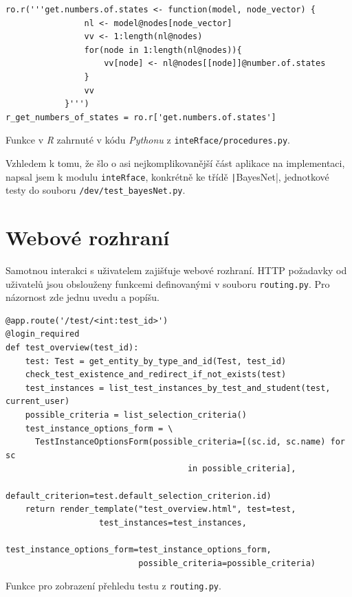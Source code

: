 \documentclass[a4paper,twoside,12pt]{scrbook}
\begin{document}
\begin{listing}
\centering
\begin{verbatim}
ro.r('''get.numbers.of.states <- function(model, node_vector) {
                nl <- model@nodes[node_vector]
                vv <- 1:length(nl@nodes)
                for(node in 1:length(nl@nodes)){
                    vv[node] <- nl@nodes[[node]]@number.of.states
                }
                vv
            }''')
r_get_numbers_of_states = ro.r['get.numbers.of.states']
\end{verbatim}
\caption{Funkce v \textit{R} zahrnuté v kódu \textit{Pythonu} z \texttt{inteRface/procedures.py}.}
\label{lst:PyR}
\end{listing}

Vzhledem k tomu, že šlo o asi nejkomplikovanější část aplikace na implementaci, napsal jsem k modulu \texttt{inteRface}, konkrétně ke třídě \texttt|BayesNet|, jednotkové testy do souboru \texttt{/dev/test\_bayesNet.py}.

\section{Webové rozhraní}
Samotnou interakci s uživatelem zajišťuje webové rozhraní. HTTP požadavky od uživatelů jsou obslouženy funkcemi definovanými v souboru \texttt{routing.py}. Pro názornost zde jednu uvedu a popíšu.

\begin{listing}
\centering
\begin{verbatim}
@app.route('/test/<int:test_id>')
@login_required
def test_overview(test_id):
    test: Test = get_entity_by_type_and_id(Test, test_id)
    check_test_existence_and_redirect_if_not_exists(test)
    test_instances = list_test_instances_by_test_and_student(test, current_user)
    possible_criteria = list_selection_criteria()
    test_instance_options_form = \
      TestInstanceOptionsForm(possible_criteria=[(sc.id, sc.name) for sc
			                         in possible_criteria],
                              default_criterion=test.default_selection_criterion.id)
    return render_template("test_overview.html", test=test,
		           test_instances=test_instances,
                           test_instance_options_form=test_instance_options_form,
                           possible_criteria=possible_criteria)

\end{verbatim}
\caption{Funkce pro zobrazení přehledu testu z \texttt{routing.py}.}
\label{lst:test_view}
\end{listing}
\end{document}
